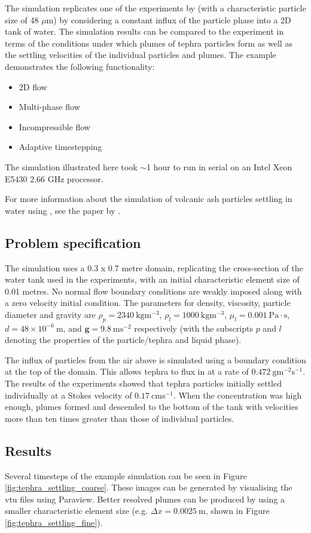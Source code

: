 The simulation replicates one of the experiments by \cite{carey1997} (with a characteristic particle size of 48 $\mu$m) by considering a constant influx of the particle phase into a 2D tank of water. The simulation results can be compared to the experiment in terms of the conditions under which plumes of tephra particles form as well as the settling velocities of the individual particles and plumes. The example demonstrates the following functionality:
\begin{itemize}
\item 2D flow
\item Multi-phase flow
\item Incompressible flow
\item Adaptive timestepping
\end{itemize}
The simulation illustrated here took $\sim$1 hour to run in serial on an Intel Xeon E5430 2.66 GHz processor. 

For more information about the simulation of volcanic ash particles settling in water using \fluidity, see the paper by \cite{Jacobs_etal_2013}.

\subsection{Problem specification}
The simulation uses a 0.3 x 0.7 metre domain, replicating the cross-section of the water tank used in the experiments, with an initial characteristic element size of 0.01 metres. No normal flow boundary conditions are weakly imposed along with a zero velocity initial condition. The parameters for density, viscosity, particle diameter and gravity are $\rho_p = 2340\ \mathrm{kgm^{-3}}$, $\rho_l = 1000\ \mathrm{kgm^{-3}}$, $\mu_l = 0.001\ \mathrm{Pa\cdot s}$, $d = 48\times 10^{-6}\ \mathrm{m}$, and $\mathbf{g} = 9.8\ \mathrm{ms^{-2}}$ respectively (with the subscripts $p$ and $l$ denoting the properties of the particle/tephra and liquid phase).

The influx of particles from the air above is simulated using a  boundary condition at the top of the domain. This allows tephra to flux in at a rate of $0.472\ \mathrm{gm^{-2}s^{-1}}$. The results of the experiments showed that tephra particles initially settled individually at a Stokes velocity of $0.17\ \mathrm{cms^{-1}}$. When the concentration was high enough, plumes formed and descended to the bottom of the tank with velocities more than ten times greater than those of individual particles.

\subsection{Results}
Several timesteps of the example simulation can be seen in Figure \ref{fig:tephra_settling_coarse}. These images can be generated by visualising the vtu files using Paraview. Better resolved plumes can be produced by using a smaller characteristic element size (e.g. $\Delta x = 0.0025\ \mathrm{m}$, shown in Figure \ref{fig:tephra_settling_fine}).

